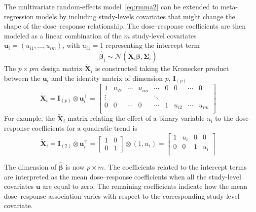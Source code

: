 \documentclass[11pt,a4paper,twoside,openany]{book}\usepackage{knitr}
\begin{document}
{{\noindent The multivariate random-effects model~\ref{eq:rmma2} can be extended to meta-regression models by including study-levels covariates that might change the shape of the dose--response relationship. The dose--response coefficients are then modeled as a linear combination of the $m$ study-level covariates $\mathbf{u}_i = \left(u_{i1}, \dots, u_{im} \right)$, with $u_{i1} = 1$ representing the intercept term
\begin{equation}
\boldsymbol{\hat \beta}_i \sim \mathcal{N}\left(\widetilde{\mathbf{X}}_i \boldsymbol{\beta}, \boldsymbol{\Sigma}_i\right)
\label{eq:rmmra2}
\end{equation}
\noindent The $p\times pm$ design matrix $\widetilde{\mathbf{X}}_i$ is constructed taking the Kronecker product between the $\mathbf{u}_i$ and the identity matrix of dimension $p$, $\mathbf{I}_{(p)}$
\begin{equation}
\widetilde{\mathbf{X}}_i = \mathbf{I}_{(p)} \otimes \mathbf{u}_i^\top = 
	\begin{bmatrix}
		1 & u_{i2} & \cdots & u_{im} & \cdots & 0 & 0 & \cdots & 0 \\
		\vdots &  &  &  & \ddots & &  &  &  \\
		0 & 0 & \cdots & 0 & \cdots & 1 & u_{i2} & \cdots & u_{im} \\
	\end{bmatrix}
\end{equation}
\noindent For example, the $\widetilde{\mathbf{X}}_i$ matrix relating the effect of a binary variable $u_i$ to the dose--response coefficients for a quadratic trend is
\begin{equation*}
\widetilde{\mathbf{X}}_i = \mathbf{I}_{(2)} \otimes \mathbf{u}_i^\top = 
	\begin{bmatrix}
		1 & 0 \\
		0 & 1
	\end{bmatrix} \otimes
	(1, u_i)=
	\begin{bmatrix}
		1 & u_i  & 0 & 0 \\
		0 & 0 & 1 & u_i  \\
	\end{bmatrix}
\end{equation*} 

\noindent The dimension of $\boldsymbol{\hat \beta}$ is now $p\times m$. The coefficients related to the intercept terms are interpreted as the mean dose--response coefficients when all the study-level covariates $\mathbf{u}$ are equal to zero. The remaining coefficients indicate how the mean dose--response association varies with respect to the corresponding study-level covariate.


}}
\end{document}
